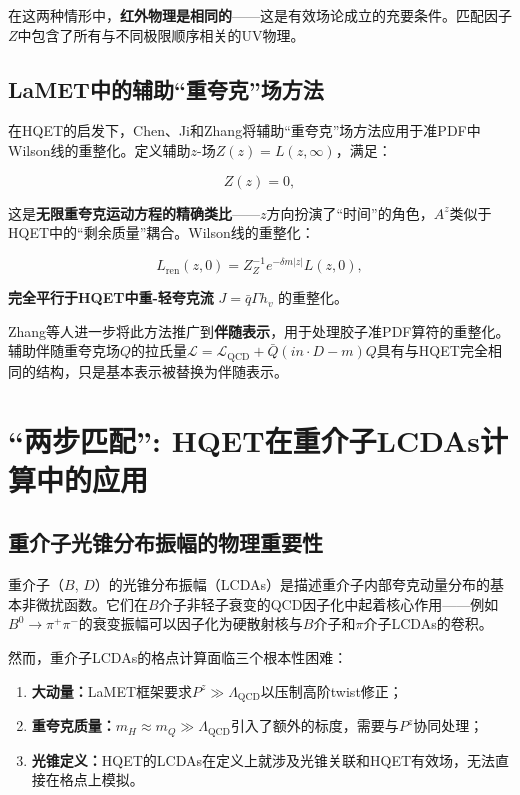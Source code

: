 \documentclass[12pt,a4paper]{ctexart}
\theoremstyle{definition}
\begin{document}
在这两种情形中，\textbf{红外物理是相同的}——这是有效场论成立的充要条件。匹配因子$Z$中包含了所有与不同极限顺序相关的UV物理。

\subsection{LaMET中的辅助``重夸克''场方法}

在HQET的启发下，Chen、Ji和Zhang\cite{Chen2016improved}将辅助``重夸克''场方法应用于准PDF中Wilson线的重整化。定义辅助$z$-场$Z(z) = L(z, \infty)$，满足：

\begin{equation}
[\partial_z - igA^z(z)] Z(z) = 0,
\label{eq:Z_field_eom}
\end{equation}

这是\textbf{无限重夸克运动方程的精确类比}——$z$方向扮演了``时间''的角色，$A^z$类似于HQET中的``剩余质量''耦合。Wilson线的重整化：

\begin{equation}
L_{\text{ren}}(z, 0) = Z^{-1}_Z e^{-\delta m |z|} L(z, 0),
\end{equation}

\textbf{完全平行于HQET中重-轻夸克流} $J = \bar{q}\Gamma h_v$ 的重整化。

Zhang等人\cite{Zhang2019}进一步将此方法推广到\textbf{伴随表示}，用于处理胶子准PDF算符的重整化。辅助伴随重夸克场$Q$的拉氏量$\mathcal{L} = \mathcal{L}_{\text{QCD}} + \bar{Q}(in\cdot D - m)Q$具有与HQET完全相同的结构，只是基本表示被替换为伴随表示。

\section{``两步匹配'': HQET在重介子LCDAs计算中的应用}

\subsection{重介子光锥分布振幅的物理重要性}

重介子（$B$, $D$）的光锥分布振幅（LCDAs）是描述重介子内部夸克动量分布的基本非微扰函数。它们在$B$介子非轻子衰变的QCD因子化中起着核心作用\cite{Han2025heavy}——例如$B^0 \to \pi^+\pi^-$的衰变振幅可以因子化为硬散射核与$B$介子和$\pi$介子LCDAs的卷积。

然而，重介子LCDAs的格点计算面临三个根本性困难：

\begin{enumerate}
    \item \textbf{大动量：}LaMET框架要求$P^z \gg \Lambda_{\text{QCD}}$以压制高阶twist修正；
    \item \textbf{重夸克质量：}$m_H \approx m_Q \gg \Lambda_{\text{QCD}}$引入了额外的标度，需要与$P^z$协同处理；
    \item \textbf{光锥定义：}HQET的LCDAs在定义上就涉及光锥关联和HQET有效场，无法直接在格点上模拟。
\end{enumerate}
\end{document}
